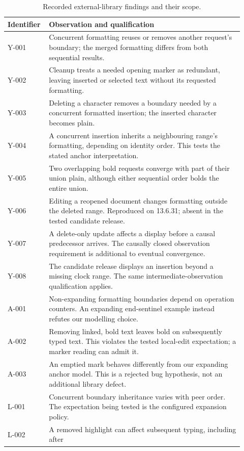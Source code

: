 \begin{table}[t]
\centering
\small
\caption{Recorded external-library findings and their scope.}
\label{tab:external-inventory}
\begin{tabular}{p{0.13\linewidth}p{0.79\linewidth}}
\hline
Identifier & Observation and qualification \\
\hline
Y-001 & Concurrent formatting reuses or removes another request's
boundary; the merged formatting differs from both sequential results. \\
Y-002 & Cleanup treats a needed opening marker as redundant, leaving
inserted or selected text without its requested formatting. \\
Y-003 & Deleting a character removes a boundary needed by a concurrent
formatted insertion; the inserted character becomes plain. \\
Y-004 & A concurrent insertion inherits a neighbouring range's formatting,
depending on identity order. This tests the stated anchor interpretation. \\
Y-005 & Two overlapping bold requests converge with part of their union
plain, although either sequential order bolds the entire union. \\
Y-006 & Editing a reopened document changes formatting outside the deleted
range. Reproduced on 13.6.31; absent in the tested candidate release. \\
Y-007 & A delete-only update affects a display before a causal predecessor
arrives. The causally closed observation requirement is additional to
eventual convergence. \\
Y-008 & The candidate release displays an insertion beyond a missing clock
range. The same intermediate-observation qualification applies. \\
A-001 & Non-expanding formatting boundaries depend on operation counters.
An expanding end-sentinel example instead refutes our modelling choice. \\
A-002 & Removing linked, bold text leaves bold on subsequently typed text.
This violates the tested local-edit expectation; a marker reading can admit it. \\
A-003 & An emptied mark behaves differently from our expanding anchor
model. This is a rejected bug hypothesis, not an additional library defect. \\
L-001 & Concurrent boundary inheritance varies with peer order. The
expectation being tested is the configured expansion policy. \\
L-002 & A removed highlight can affect subsequent typing, including after

\end{tabular}
\end{table}
